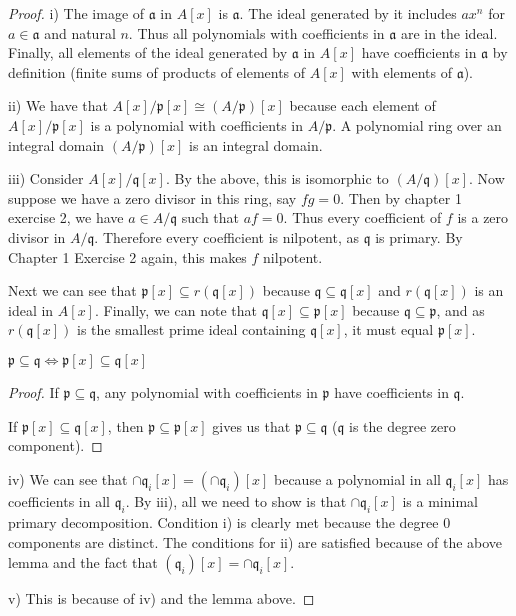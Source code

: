 \begin{proof}
	i) The image of $\mathfrak{a} $ in $A[x] $ is $\mathfrak{a} $.
	The ideal generated by it includes $ax^n $ for $a\in \mathfrak{a} $ and natural $n $.
	Thus all polynomials with coefficients in $\mathfrak{a} $ are in the ideal.
	Finally, all elements of the ideal generated by $\mathfrak{a} $ in $A[x] $ have coefficients in $\mathfrak{a} $ by definition (finite sums of products of elements of $A[x] $ with elements of $\mathfrak{a} $).

	ii) We have that $A[x] / \mathfrak{p}[x] \cong (A / \mathfrak{p})[x] $ because each element of $A[x] / \mathfrak{p}[x] $ is a polynomial with coefficients in $A / \mathfrak{p} $.
	A polynomial ring over an integral domain $(A / \mathfrak{p})[x] $ is an integral domain.

	iii) Consider $A[x] / \mathfrak{q}[x] $.
	By the above, this is isomorphic to $(A / \mathfrak{q})[x] $.
	Now suppose we have a zero divisor in this ring, say $fg=0 $.
	Then by chapter 1 exercise 2, we have $a \in A / \mathfrak{q} $ such that $af = 0 $.
	Thus every coefficient of $f $ is a zero divisor in $A / \mathfrak{q} $.
	Therefore every coefficient is nilpotent, as $\mathfrak{q} $ is primary.
	By Chapter 1 Exercise 2 again, this makes $f $ nilpotent.

	Next we can see that $\mathfrak{p}[x] \subseteq r(\mathfrak{q}[x])$ because $\mathfrak{q}\subseteq \mathfrak{q}[x] $ and $r(\mathfrak{q}[x]) $ is an ideal in $A[x] $.
	Finally, we can note that $\mathfrak{q}[x] \subseteq \mathfrak{p}[x] $ because $\mathfrak{q} \subseteq \mathfrak{p} $, and as $r(\mathfrak{q}[x]) $ is the smallest prime ideal containing $\mathfrak{q}[x] $, it must equal $\mathfrak{p}[x] $.

	\begin{lem}
		$\mathfrak{p} \subseteq \mathfrak{q} \iff \mathfrak{p}[x] \subseteq \mathfrak{q}[x] $
	\end{lem}
	\begin{proof}
		If $\mathfrak{p} \subseteq \mathfrak{q} $, any polynomial with coefficients in $\mathfrak{p} $ have coefficients in $\mathfrak{q} $.

		If $\mathfrak{p}[x] \subseteq \mathfrak{q}[x] $, then $\mathfrak{p} \subseteq \mathfrak{p}[x]$ gives us that $\mathfrak{p}\subseteq \mathfrak{q} $ ($\mathfrak{q} $ is the degree zero component).
	\end{proof}

	iv) We can see that $\cap \mathfrak{q}_i[x] = (\cap \mathfrak{q}_i)[x] $ because a polynomial in all $\mathfrak{q}_i[x] $ has coefficients in all $\mathfrak{q}_i $.
	By iii), all we need to show is that $\cap \mathfrak{q}_i[x] $ is a minimal primary decomposition.
	Condition i) is clearly met because the degree $0$ components are distinct.
	The conditions for ii) are satisfied because of the above lemma and the fact that $(\mathfrak{q}_i)[x] = \cap \mathfrak{q}_i[x]$.

	v) This is because of iv) and the lemma above.
\end{proof}

